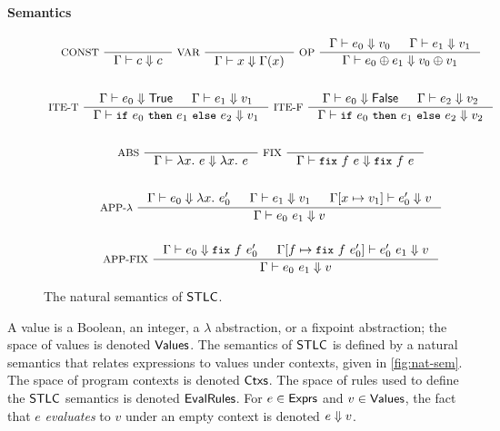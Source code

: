 \paragraph{Semantics}
%
\begin{figure}
  \centering
  \begin{gather*}
  \inference[ CONST ]{ }{ \Gamma \judges c \evalsto c } 
  \inference[ VAR ]{ }{ \Gamma \judges x \evalsto \Gamma(x) }
  \inference[ OP ]{ %
    \Gamma \judges e_0 \evalsto v_0 & %
    \Gamma \judges e_1 \evalsto v_1 } %
  { \Gamma \judges e_0 \oplus e_1 \evalsto v_0 \oplus v_1 } \\
  \\
  \inference[ ITE-T ]{ %
    \Gamma \judges e_0 \evalsto \true & %
    \Gamma \judges e_1 \evalsto v_1 } %
  { \Gamma \judges \ite{ e_0 }{ e_1 }{ e_2 } \evalsto v_1 }
  \inference[ ITE-F ]{ %
    \Gamma \judges e_0 \evalsto \false & %
    \Gamma \judges e_2 \evalsto v_2 } %
  { \Gamma \judges \ite{ e_0 }{ e_1 }{ e_2 } \evalsto v_2 } \\
  \\
  \inference[ ABS ]{ } %
  { \Gamma \judges \lambda x.\ e \evalsto \lambda x.\ e }
  \inference[ FIX ]{ } %
  { \Gamma \judges \fix{ f }{ e } \evalsto \fix{ f }{ e } } \\
  \\
  \inference[ APP-$\lambda$ ]{ %
    \Gamma \judges e_0 \evalsto \lambda x.\ e_0' & %
    \Gamma \judges e_1 \evalsto v_1 & %
    \upd{\Gamma}{x}{v_1} \judges e_0' \evalsto v }
  { \Gamma \judges e_0\ e_1 \evalsto v } \\
  \\
  \inference[ APP-FIX ]{ %
    \Gamma \judges e_0 \evalsto \fix{ f }{ e_0' } & %
    \upd{ \Gamma }{ f }{ \fix{ f }{ e_0' } } \judges %
    e_0'\ e_1 \evalsto v }
  { \Gamma \judges e_0\ e_1 \evalsto v } 
  \end{gather*}
  \caption{The natural semantics of $\mathsf{STLC}$.}
  \label{fig:nat-sem}
\end{figure}
%
A value is a Boolean, an integer, a $\lambda$ abstraction, or a
fixpoint abstraction;
%
the space of values is denoted $\mathsf{Values}$.
%
The semantics of $\mathsf{STLC}$ is defined by a natural semantics that
relates expressions to values under contexts, given in
\autoref{fig:nat-sem}.
%
The space of program contexts is denoted $\mathsf{Ctxs}$.
%
The space of rules used to define the $\mathsf{STLC}$ semantics is denoted
$\mathsf{EvalRules}$.
%
For $e \in \mathsf{Exprs}$ and $v \in \mathsf{Values}$, the fact that $e$
\emph{evaluates} to $v$ under an empty context is denoted $e \Downarrow
v$.

